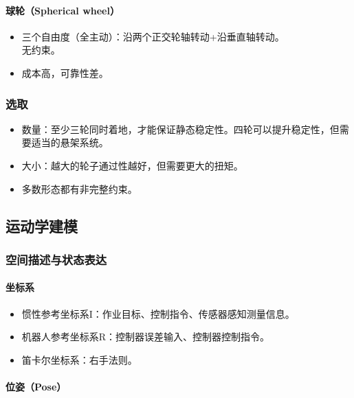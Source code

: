 \documentclass[
12pt, %
a4paper, 
oneside, %
headinclude,footinclude, %
]{scrartcl}
\begin{document}
\paragraph{球轮（Spherical wheel）}
\begin{itemize}
\item 三个自由度（全主动）：沿两个正交轮轴转动+沿垂直轴转动。 \\
无约束。
\item 成本高，可靠性差。
\end{itemize}
\subsubsection{选取}
\begin{itemize}
\item 数量：至少三轮同时着地，才能保证静态稳定性。四轮可以提升稳定性，但需要适当的悬架系统。
\item 大小：越大的轮子通过性越好，但需要更大的扭矩。
\item 多数形态都有非完整约束。
\end{itemize}
\subsection{运动学建模}
\subsubsection{空间描述与状态表达}
\paragraph{坐标系}
\begin{itemize}
\item 惯性参考坐标系I：作业目标、控制指令、传感器感知测量信息。
\item 机器人参考坐标系R：控制器误差输入、控制器控制指令。
\item 笛卡尔坐标系：右手法则。
\end{itemize}
\paragraph{位姿（Pose）}~\\
\end{document}
